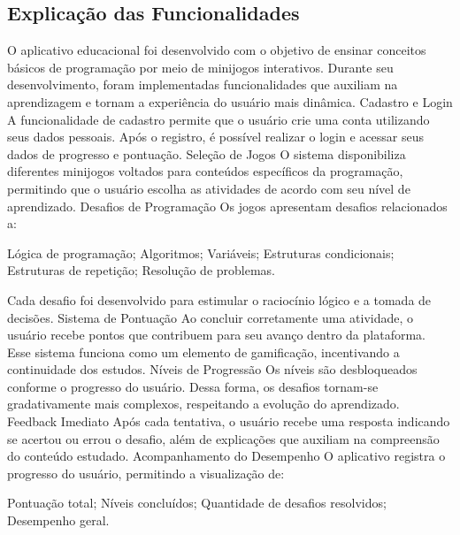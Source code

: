 \documentclass{article}
\begin{document}
\subsection{ Explicação das Funcionalidades}
O aplicativo educacional foi desenvolvido com o objetivo de ensinar conceitos básicos de programação por meio de minijogos interativos. Durante seu desenvolvimento, foram implementadas funcionalidades que auxiliam na aprendizagem e tornam a experiência do usuário mais dinâmica.
Cadastro e Login
A funcionalidade de cadastro permite que o usuário crie uma conta utilizando seus dados pessoais. Após o registro, é possível realizar o login e acessar seus dados de progresso e pontuação.
Seleção de Jogos
O sistema disponibiliza diferentes minijogos voltados para conteúdos específicos da programação, permitindo que o usuário escolha as atividades de acordo com seu nível de aprendizado.
Desafios de Programação
Os jogos apresentam desafios relacionados a:

Lógica de programação;
Algoritmos;
Variáveis;
Estruturas condicionais;
Estruturas de repetição;
Resolução de problemas.

Cada desafio foi desenvolvido para estimular o raciocínio lógico e a tomada de decisões.
Sistema de Pontuação
Ao concluir corretamente uma atividade, o usuário recebe pontos que contribuem para seu avanço dentro da plataforma. Esse sistema funciona como um elemento de gamificação, incentivando a continuidade dos estudos.
Níveis de Progressão
Os níveis são desbloqueados conforme o progresso do usuário. Dessa forma, os desafios tornam-se gradativamente mais complexos, respeitando a evolução do aprendizado.
Feedback Imediato
Após cada tentativa, o usuário recebe uma resposta indicando se acertou ou errou o desafio, além de explicações que auxiliam na compreensão do conteúdo estudado.
Acompanhamento do Desempenho
O aplicativo registra o progresso do usuário, permitindo a visualização de:

Pontuação total;
Níveis concluídos;
Quantidade de desafios resolvidos;
Desempenho geral.
\end{document}
